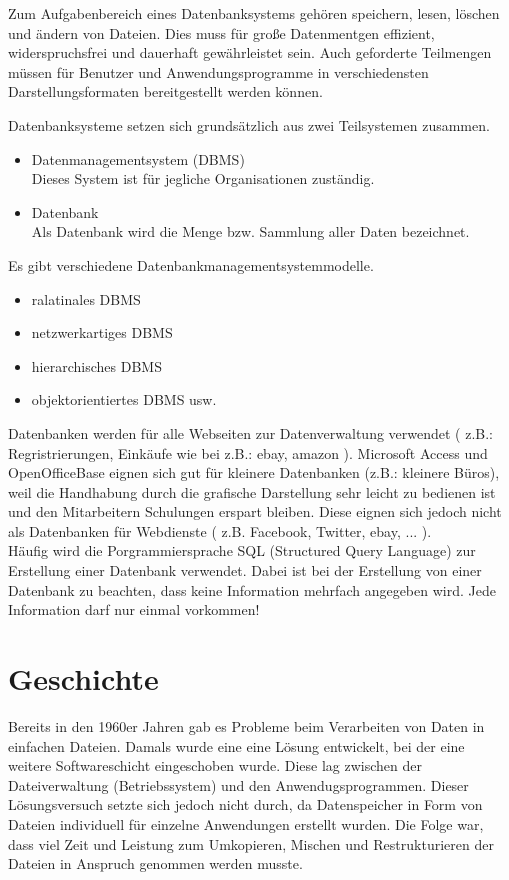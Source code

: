 \documentclass[12pt,a4paper]{report}
\begin{document}
Zum Aufgabenbereich eines Datenbanksystems gehören speichern, lesen, löschen und ändern von Dateien. Dies muss für große Datenmentgen effizient, widerspruchsfrei und dauerhaft gewährleistet sein. Auch geforderte Teilmengen müssen für Benutzer und Anwendungsprogramme in verschiedensten Darstellungsformaten bereitgestellt werden können.

Datenbanksysteme setzen sich grundsätzlich aus zwei Teilsystemen zusammen.

\begin{itemize}
\item Datenmanagementsystem (DBMS)\\
Dieses System ist für jegliche Organisationen zuständig.
\item Datenbank\\
Als Datenbank wird die Menge bzw. Sammlung aller Daten bezeichnet.
\end{itemize} 

Es gibt verschiedene Datenbankmanagementsystemmodelle.
\begin{itemize}
\item ralatinales DBMS
\item netzwerkartiges DBMS
\item hierarchisches DBMS
\item objektorientiertes DBMS usw.
\end{itemize}

Datenbanken werden für alle Webseiten zur Datenverwaltung verwendet ( z.B.: Regristrierungen, Einkäufe wie bei z.B.: ebay, amazon ).
Microsoft Access und OpenOfficeBase eignen sich gut für kleinere Datenbanken (z.B.: kleinere Büros), weil die Handhabung durch die grafische Darstellung sehr leicht zu bedienen ist und den Mitarbeitern Schulungen erspart bleiben.
Diese eignen sich jedoch nicht als Datenbanken für Webdienste ( z.B. Facebook, Twitter, ebay, ... ).\\

Häufig wird die Porgrammiersprache SQL (Structured Query Language) zur Erstellung einer Datenbank verwendet. Dabei ist bei der Erstellung von einer Datenbank zu beachten, dass keine Information mehrfach angegeben wird. Jede Information darf nur einmal vorkommen!

\section{Geschichte}
Bereits in den 1960er Jahren gab es Probleme beim Verarbeiten von Daten in einfachen Dateien. Damals wurde eine eine Lösung entwickelt, bei der eine weitere Softwareschicht eingeschoben wurde. Diese lag zwischen der Dateiverwaltung (Betriebssystem) und den Anwendugsprogrammen. Dieser Lösungsversuch setzte sich jedoch nicht durch, da Datenspeicher in Form von Dateien individuell für einzelne Anwendungen erstellt wurden. Die Folge war, dass viel Zeit und Leistung zum Umkopieren, Mischen und Restrukturieren der Dateien in Anspruch genommen werden musste.\\
\end{document}
